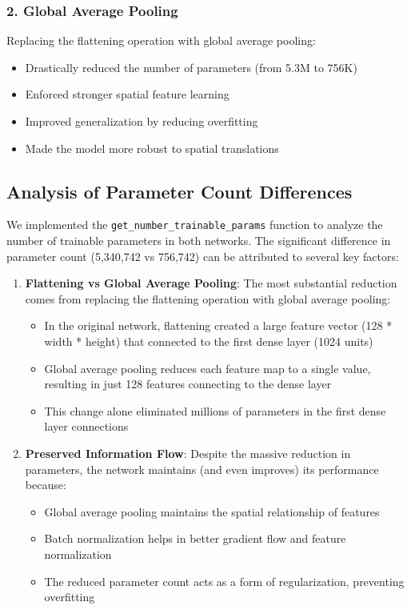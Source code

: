 \subsubsection{2. Global Average Pooling}
Replacing the flattening operation with global average pooling:
\begin{itemize}
    \item Drastically reduced the number of parameters (from 5.3M to 756K)
    \item Enforced stronger spatial feature learning
    \item Improved generalization by reducing overfitting
    \item Made the model more robust to spatial translations
\end{itemize}

\subsection{Analysis of Parameter Count Differences}

We implemented the \texttt{get\_number\_trainable\_params} function to analyze the number of trainable parameters in both networks. The significant difference in parameter count (5,340,742 vs 756,742) can be attributed to several key factors:

\begin{enumerate}
    \item \textbf{Flattening vs Global Average Pooling}: The most substantial reduction comes from replacing the flattening operation with global average pooling:
    \begin{itemize}
        \item In the original network, flattening created a large feature vector (128 * width * height) that connected to the first dense layer (1024 units)
        \item Global average pooling reduces each feature map to a single value, resulting in just 128 features connecting to the dense layer
        \item This change alone eliminated millions of parameters in the first dense layer connections
    \end{itemize}
    
    \item \textbf{Preserved Information Flow}: Despite the massive reduction in parameters, the network maintains (and even improves) its performance because:
    \begin{itemize}
        \item Global average pooling maintains the spatial relationship of features
        \item Batch normalization helps in better gradient flow and feature normalization
        \item The reduced parameter count acts as a form of regularization, preventing overfitting
    \end{itemize}
\end{enumerate}


